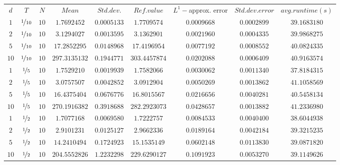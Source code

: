 \begin{tabular}{ccccccccc}
$d$ & $T$ & $N$ & $Mean$ & $Std. dev.$ & $Ref. value$ & $L^1-$approx. error & $Std. dev. error$ & $avg. runtime (s)$\\
$1$ & $\nicefrac{1}{10}$ & $10$ & $1.7692452$ & $0.0005133$ & $1.7709574$ & $0.0009668$ & $0.0002899$ & $39.1683180$\\
$2$ & $\nicefrac{1}{10}$ & $10$ & $3.1294027$ & $0.0013595$ & $3.1362901$ & $0.0021960$ & $0.0004335$ & $39.9868275$\\
$5$ & $\nicefrac{1}{10}$ & $10$ & $17.2852295$ & $0.0148968$ & $17.4196954$ & $0.0077192$ & $0.0008552$ & $40.0824335$\\
$10$ & $\nicefrac{1}{10}$ & $10$ & $297.3135132$ & $0.1944771$ & $303.4457874$ & $0.0202088$ & $0.0006409$ & $40.9163574$\\
$1$ & $\nicefrac{1}{5}$ & $10$ & $1.7529210$ & $0.0019939$ & $1.7582066$ & $0.0030062$ & $0.0011340$ & $37.8184315$\\
$2$ & $\nicefrac{1}{5}$ & $10$ & $3.0757507$ & $0.0042852$ & $3.0912904$ & $0.0050269$ & $0.0013862$ & $41.1058569$\\
$5$ & $\nicefrac{1}{5}$ & $10$ & $16.4375404$ & $0.0676776$ & $16.8015567$ & $0.0216656$ & $0.0040281$ & $40.5458134$\\
$10$ & $\nicefrac{1}{5}$ & $10$ & $270.1916382$ & $0.3918688$ & $282.2923073$ & $0.0428657$ & $0.0013882$ & $41.2336980$\\
$1$ & $\nicefrac{1}{2}$ & $10$ & $1.7077168$ & $0.0069580$ & $1.7222757$ & $0.0084533$ & $0.0040400$ & $38.6044938$\\
$2$ & $\nicefrac{1}{2}$ & $10$ & $2.9101231$ & $0.0125127$ & $2.9662336$ & $0.0189164$ & $0.0042184$ & $39.3215235$\\
$5$ & $\nicefrac{1}{2}$ & $10$ & $14.2410494$ & $0.1724923$ & $15.1535149$ & $0.0602148$ & $0.0113830$ & $39.0871820$\\
$10$ & $\nicefrac{1}{2}$ & $10$ & $204.5552826$ & $1.2232298$ & $229.6290127$ & $0.1091923$ & $0.0053270$ & $39.1149626$\\
\end{tabular}
